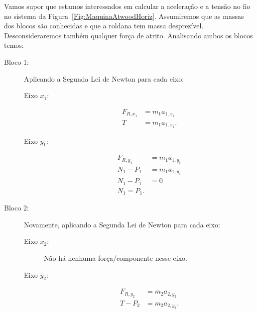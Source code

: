 Vamos supor que estamos interessados em calcular a aceleração e a tensão no fio no sistema da Figura~\ref{Fig:MaquinaAtwoodHoriz}. Assumiremos que as massas dos blocos são conhecidas e que a roldana tem massa desprezível. Desconsideraremos também qualquer força de atrito. Analisando ambos os blocos temos:
\begin{description}
    \item[Bloco 1:] Aplicando a Segunda Lei de Newton para cada eixo:
        \begin{description}
            \item[Eixo $x_1$:]
                \begin{align}
                    F_{R, x_1} &= m_1 a_{1,x_1} \\
                    T & = m_1 a_{1,x_1}. \label{Eq:AtwoodHorizX1}
                \end{align}
            \item[Eixo $y_1$:]
                \begin{align}
                    F_{R, y_1} &= m_1 a_{1,y_1} \\
                    N_1 - P_1 &= m_1 a_{1,y_1} \\
                    N_1 - P_1 &= 0 \\
                    N_1 = P_1.
                \end{align}
        \end{description}
    \item[Bloco 2:] Novamente, aplicando a Segunda Lei de Newton para cada eixo:
        \begin{description}
            \item[Eixo $x_2$:] Não há nenhuma força/componente nesse eixo.
            \item[Eixo $y_2$:]
                \begin{align}
                    F_{R, y_2} &= m_2 a_{2,y_2} \\
                    T - P_2 &= m_2 a_{2,y_2}. \label{Eq:AtwoodHorizY2}
                \end{align}
        \end{description}
\end{description}

